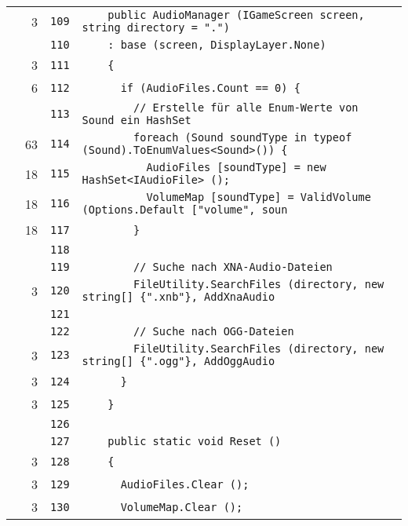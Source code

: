\documentclass[a4paper,10pt]{article}
\begin{document}
\begin{longtable}[l]{lrrl}
\cellcolor{green} & 3 & \verb~109~ & \verb~    public AudioManager (IGameScreen screen, string directory = ".")~\\
\cellcolor{gray} &  & \verb~110~ & \verb~    : base (screen, DisplayLayer.None)~\\
\cellcolor{green} & 3 & \verb~111~ & \verb~    {~\\
\cellcolor{green} & 6 & \verb~112~ & \verb~      if (AudioFiles.Count == 0) {~\\
\cellcolor{gray} &  & \verb~113~ & \verb~        // Erstelle für alle Enum-Werte von Sound ein HashSet~\\
\cellcolor{green} & 63 & \verb~114~ & \verb~        foreach (Sound soundType in typeof (Sound).ToEnumValues<Sound>()) {~\\
\cellcolor{green} & 18 & \verb~115~ & \verb~          AudioFiles [soundType] = new HashSet<IAudioFile> ();~\\
\cellcolor{green} & 18 & \verb~116~ & \verb~          VolumeMap [soundType] = ValidVolume (Options.Default ["volume", soun~\\
\cellcolor{green} & 18 & \verb~117~ & \verb~        }~\\
\cellcolor{gray} &  & \verb~118~ & \verb~~\\
\cellcolor{gray} &  & \verb~119~ & \verb~        // Suche nach XNA-Audio-Dateien~\\
\cellcolor{green} & 3 & \verb~120~ & \verb~        FileUtility.SearchFiles (directory, new string[] {".xnb"}, AddXnaAudio~\\
\cellcolor{gray} &  & \verb~121~ & \verb~~\\
\cellcolor{gray} &  & \verb~122~ & \verb~        // Suche nach OGG-Dateien~\\
\cellcolor{green} & 3 & \verb~123~ & \verb~        FileUtility.SearchFiles (directory, new string[] {".ogg"}, AddOggAudio~\\
\cellcolor{green} & 3 & \verb~124~ & \verb~      }~\\
\cellcolor{green} & 3 & \verb~125~ & \verb~    }~\\
\cellcolor{gray} &  & \verb~126~ & \verb~~\\
\cellcolor{gray} &  & \verb~127~ & \verb~    public static void Reset ()~\\
\cellcolor{green} & 3 & \verb~128~ & \verb~    {~\\
\cellcolor{green} & 3 & \verb~129~ & \verb~      AudioFiles.Clear ();~\\
\cellcolor{green} & 3 & \verb~130~ & \verb~      VolumeMap.Clear ();~\\

\end{longtable}
\end{document}
